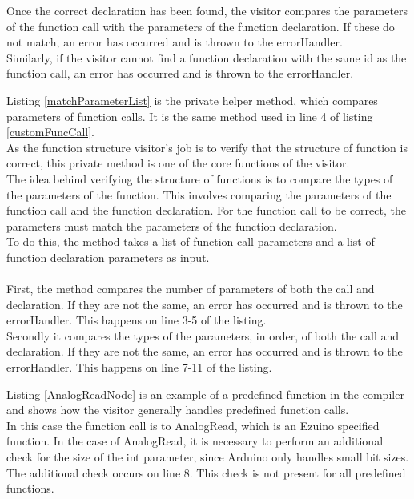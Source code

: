 Once the correct declaration has been found, the visitor compares the parameters of the function call with the parameters of the function declaration. If these do not match, an error has occurred and is thrown to the errorHandler.\\
Similarly, if the visitor cannot find a function declaration with the same id as the function call, an error has occurred and is thrown to the errorHandler.

\noindent\newline
Listing \ref{matchParameterList} is the private helper method, which compares parameters of function calls. It is the same method used in line 4 of listing \ref{customFuncCall}.\\
As the function structure visitor’s job is to verify that the structure of function is correct, this private method is one of the core functions of the visitor.\\
The idea behind verifying the structure of functions is to compare the types of the parameters of the function. This involves comparing the parameters of the function call and the function declaration. For the function call to be correct, the parameters must match the parameters of the function declaration.\\
To do this, the method takes a list of function call parameters and a list of function declaration parameters as input.
\\\\
First, the method compares the number of parameters of both the call and declaration. If they are not the same, an error has occurred and is thrown to the errorHandler. This happens on line 3-5 of the listing.\\
Secondly it compares the types of the parameters, in order, of both the call and declaration. If they are not the same, an error has occurred and is thrown to the errorHandler. This happens on line 7-11 of the listing.

\noindent\newline
Listing \ref{AnalogReadNode} is an example of a predefined function in the compiler and shows how the visitor generally handles predefined function calls.\\
In this case the function call is to AnalogRead, which is an Ezuino specified function. In the case of AnalogRead, it is necessary to perform an additional check for the size of the int parameter, since Arduino only handles small bit sizes. The additional check occurs on line 8. This check is not present for all predefined functions.
